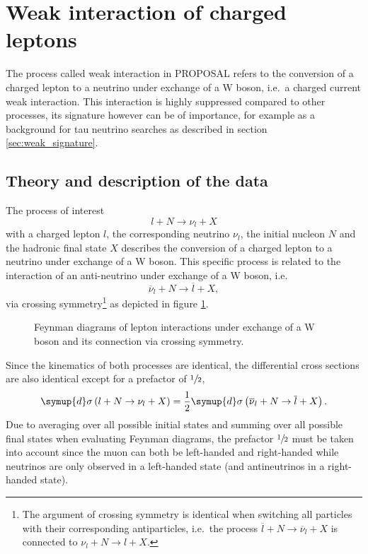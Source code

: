 \section{Weak interaction of charged leptons}

The process called weak interaction in PROPOSAL refers to the conversion of a charged lepton to a neutrino under exchange of a W boson, i.e.\ a charged current weak interaction.
This interaction is highly suppressed compared to other processes, its signature however can be of importance, for example as a background for tau neutrino searches as described in section \ref{sec:weak_signature}.

\subsection{Theory and description of the data}
\label{sec:weak_theory}

The process of interest
%
\begin{equation}
    \label{eqn:weak_lepton}
    l + N \rightarrow \nu_l + X
\end{equation}
%
with a charged lepton $l$, the corresponding neutrino $\nu_l$, the initial nucleon $N$ and the hadronic final state $X$ describes the conversion of a charged lepton to a neutrino under exchange of a W boson.
This specific process is related to the interaction of an anti-neutrino under exchange of a W boson, i.e.\
%
\begin{equation}
    \label{eqn:weak_neutrino}
    \overline{\nu}_l + N \rightarrow \overline{l} + X,
\end{equation}
%
via crossing symmetry\footnote{The argument of crossing symmetry is identical when switching all particles with their corresponding antiparticles, i.e.\ the process $\overline{l} + N \rightarrow \overline{\nu}_l + X$ is connected to $\nu_l + N \rightarrow l + X$.} as depicted in figure \ref{fig:feynman_weak}.
%
\begin{figure}
    \centering
    
    \caption{Feynman diagrams of lepton interactions under exchange of a W boson and its connection via crossing symmetry.}
    \label{fig:feynman_weak}
\end{figure}
%
Since the kinematics of both processes are identical, the differential cross sections are also identical except for a prefactor of $\sfrac{1}{2}$,
%
\begin{equation}
    \symup{d}\sigma\left( l + N \rightarrow \nu_l + X \right) = \frac{1}{2} \symup{d}\sigma\left( \overline{\nu}_l + N \rightarrow \overline{l} + X \right).
\end{equation}
%
Due to averaging over all possible initial states and summing over all possible final states when evaluating Feynman diagrams, the prefactor $\sfrac{1}{2}$ must be taken into account since the muon can both be left-handed and right-handed while neutrinos are only observed in a left-handed state (and antineutrinos in a right-handed state).

